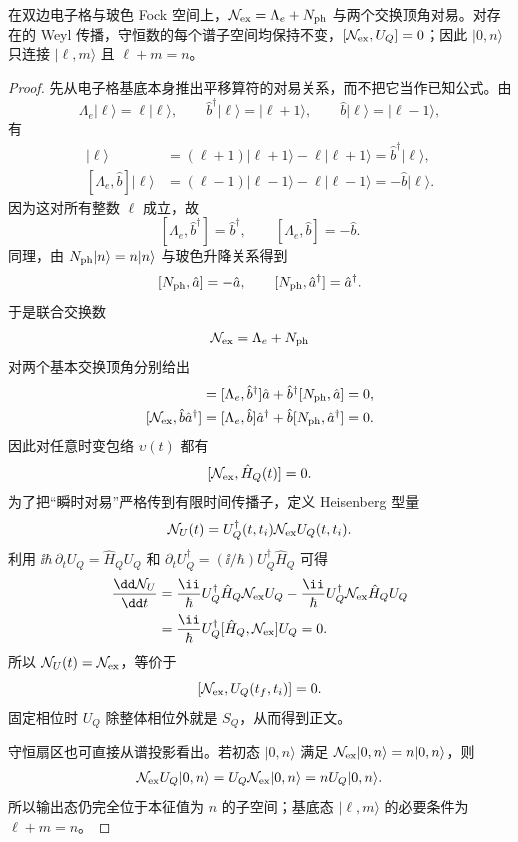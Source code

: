 \begin{proposition}[联合交换数的守恒与谱扇区]
在双边电子格与玻色 Fock 空间上，$\mathcal N_{\rm ex}=\Lambda_e+N_{\rm ph}$ 与两个交换顶角对易。对存在的 Weyl 传播，守恒数的每个谱子空间均保持不变，$[\mathcal N_{\rm ex},U_Q]=0$；因此 $|0,n\rangle$ 只连接 $|\ell,m\rangle$ 且 $\ell+m=n$。
\end{proposition}
\begin{proof}
先从电子格基底本身推出平移算符的对易关系，而不把它当作已知公式。由
\[
\Lambda_e|\ell\rangle=\ell|\ell\rangle,
\qquad
\hat b^\dagger|\ell\rangle=|\ell+1\rangle,
\qquad
\hat b|\ell\rangle=|\ell-1\rangle,
\]
有
\begin{align*}
[\Lambda_e,\hat b^\dagger]|\ell\rangle
&=(\ell+1)|\ell+1\rangle-\ell|\ell+1\rangle
=\hat b^\dagger|\ell\rangle,\\
[\Lambda_e,\hat b]|\ell\rangle
&=(\ell-1)|\ell-1\rangle-\ell|\ell-1\rangle
=-\hat b|\ell\rangle.
\end{align*}
因为这对所有整数 $\ell$ 成立，故
\[
[\Lambda_e,\hat b^\dagger]=\hat b^\dagger,
\qquad [\Lambda_e,\hat b]=-\hat b.
\]
同理，由 $N_{\rm ph}|n\rangle=n|n\rangle$ 与玻色升降关系得到
\[
[N_{\rm ph},\hat a]=-\hat a,
\qquad
[N_{\rm ph},\hat a^\dagger]=\hat a^\dagger.
\]
于是联合交换数
\[
\mathcal N_{\rm ex}=\Lambda_e+N_{\rm ph}
\]
对两个基本交换顶角分别给出
\begin{align*}
[\mathcal N_{\rm ex},\hat b^\dagger\hat a]
&=[\Lambda_e,\hat b^\dagger]\hat a
+\hat b^\dagger[N_{\rm ph},\hat a]
=0,\\
[\mathcal N_{\rm ex},\hat b\hat a^\dagger]
&=[\Lambda_e,\hat b]\hat a^\dagger
+\hat b[N_{\rm ph},\hat a^\dagger]
=0.
\end{align*}
因此对任意时变包络 $\upsilon(t)$ 都有
\[
[\mathcal N_{\rm ex},\hat H_Q(t)]=0.
\]
为了把“瞬时对易”严格传到有限时间传播子，定义 Heisenberg 型量
\[
\mathcal N_U(t)=U_Q^\dagger(t,t_i)\mathcal N_{\rm ex}U_Q(t,t_i).
\]
利用
$\ii\hbar\,\partial_tU_Q=\hat H_QU_Q$
和
$\partial_tU_Q^\dagger=(\ii/\hbar)U_Q^\dagger\hat H_Q$
可得
\begin{align*}
\frac{\dd\mathcal N_U}{\dd t}
&=\frac{\ii}{\hbar}U_Q^\dagger\hat H_Q\mathcal N_{\rm ex}U_Q
-\frac{\ii}{\hbar}U_Q^\dagger\mathcal N_{\rm ex}\hat H_QU_Q\\
&=\frac{\ii}{\hbar}U_Q^\dagger[\hat H_Q,\mathcal N_{\rm ex}]U_Q=0.
\end{align*}
所以 $\mathcal N_U(t)=\mathcal N_{\rm ex}$，等价于
\[
[\mathcal N_{\rm ex},U_Q(t_f,t_i)]=0.
\]
固定相位时 $U_Q$ 除整体相位外就是 $S_Q$，从而得到正文。

守恒扇区也可直接从谱投影看出。若初态 $|0,n\rangle$ 满足
$\mathcal N_{\rm ex}|0,n\rangle=n|0,n\rangle$，则
\begin{align*}
\mathcal N_{\rm ex}U_Q|0,n\rangle
=U_Q\mathcal N_{\rm ex}|0,n\rangle
=nU_Q|0,n\rangle.
\end{align*}
所以输出态仍完全位于本征值为 $n$ 的子空间；基底态 $|\ell,m\rangle$ 的必要条件为 $\ell+m=n$。
\end{proof}


